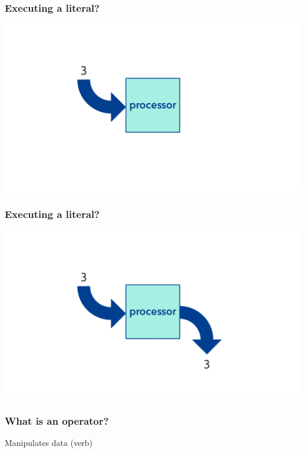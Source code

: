 \documentclass[11pt]{beamer}
\begin{document}
\begin{frame}
  \frametitle{Executing a literal?}
  \includegraphics[width=\textwidth]{./img/computer-literal-0.png}
\end{frame}

\begin{frame}
  \frametitle{Executing a literal?}
  \includegraphics[width=\textwidth]{./img/computer-literal-1.png}
\end{frame}

\begin{frame}
  \frametitle{What is an \textbf{operator}?}
  \Enlarge

  \begin{itemize}
  \myitem  Manipulates data (verb)
  \end{itemize}
\end{frame}
\end{document}
